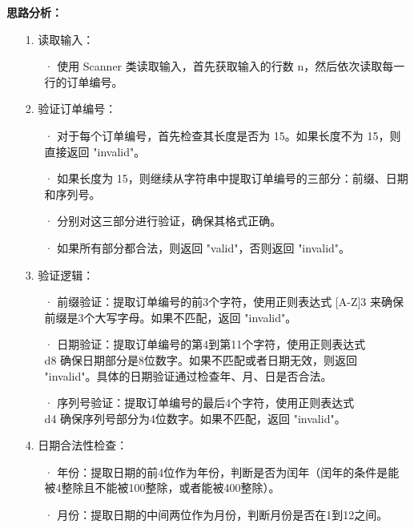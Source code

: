 \documentclass[a4paper]{ctexart}
\begin{document}
	
\vspace{10pt}
	
\noindent\textbf{思路分析：}
\begin{itemize}
	\item[1.] 读取输入：
	\begin{itemize}
		\item[·] 使用 Scanner 类读取输入，首先获取输入的行数 n，然后依次读取每一行的订单编号。
	\end{itemize}

	\item[2.] 验证订单编号：
	\begin{itemize}
		\item[·] 对于每个订单编号，首先检查其长度是否为 15。如果长度不为 15，则直接返回 "invalid"。
		
		\item[·] 如果长度为 15，则继续从字符串中提取订单编号的三部分：前缀、日期和序列号。
		
		\item[·] 分别对这三部分进行验证，确保其格式正确。
		
		\item[·] 如果所有部分都合法，则返回 "valid"，否则返回 "invalid"。
	\end{itemize}

	\item[3.] 验证逻辑：
	\begin{itemize}
		\item[·] 前缀验证：提取订单编号的前3个字符，使用正则表达式 [A-Z]{3} 来确保前缀是3个大写字母。如果不匹配，返回 "invalid"。
	
		\item[·] 日期验证：提取订单编号的第4到第11个字符，使用正则表达式 \\d{8} 确保日期部分是8位数字。如果不匹配或者日期无效，则返回 "invalid"。具体的日期验证通过检查年、月、日是否合法。
	
		\item[·] 序列号验证：提取订单编号的最后4个字符，使用正则表达式 \\d{4} 确保序列号部分为4位数字。如果不匹配，返回 "invalid"。
	\end{itemize}
	
	\item[4.] 日期合法性检查：
	\begin{itemize}
		\item[·] 年份：提取日期的前4位作为年份，判断是否为闰年（闰年的条件是能被4整除且不能被100整除，或者能被400整除）。
	
		\item[·] 月份：提取日期的中间两位作为月份，判断月份是否在1到12之间。
	

\end{itemize}
\end{itemize}
\end{document}
